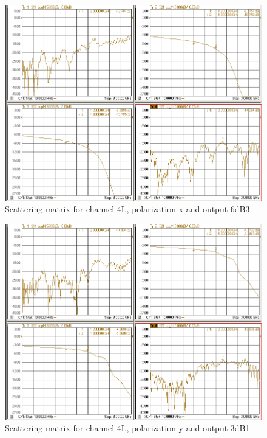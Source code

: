 \documentclass[12pt,a4paper,oneside]{article}
\begin{document}
\begin{figure}[H]
\centering
\includegraphics[width=0.9\linewidth]{VNA_results/4Lx_6dB3.png}
\caption{Scattering matrix for channel 4L, polarization x and output 6dB3.}
\label{fig:4Lx_6dB3}
\end{figure}


\begin{figure}[H]
\centering
\includegraphics[width=0.9\linewidth]{VNA_results/4Ly_3dB1.png}
\caption{Scattering matrix for channel 4L, polarization y and output 3dB1.}
\label{fig:4Ly_3dB1}
\end{figure}
\end{document}
